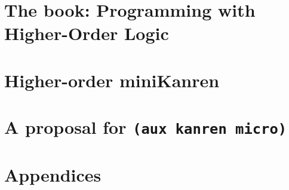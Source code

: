 \documentclass[a4paper,justified,nofonts,nobib,nols]{tufte-book}
\begin{document}
\tableofcontents

\mainmatter



\part{The book: Programming with Higher-Order Logic}








\part{Higher-order miniKanren}


\part{A proposal for \texorpdfstring{\texttt{(aux kanren micro)}}{(aux kanren micro)}}






\appendix
\part*{Appendices}



\backmatter
\cleardoublepage
{}
{}
{\RaggedRight %
}
\end{document}
